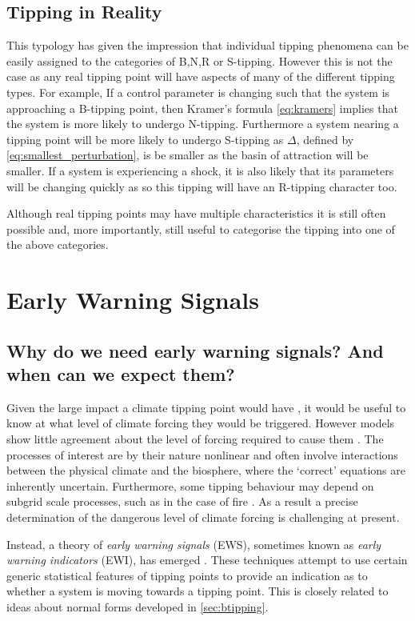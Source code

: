 \subsection{Tipping in Reality}
This typology has given the impression that individual tipping phenomena can be easily assigned to the categories of B,N,R or S-tipping. However this is not the case as any
real tipping point will have aspects of many of the different tipping types. For example, If a control parameter is changing such that the system is approaching a B-tipping point,
then Kramer's formula \cref{eq:kramers} implies that the system is more likely to undergo N-tipping. Furthermore a system nearing a tipping point will be more likely to undergo S-tipping as
$\Delta$, defined by \cref{eq:smallest_perturbation}, is be smaller as the basin of attraction will be smaller. If a system is experiencing a shock, it is also likely that its parameters will
be changing quickly as so this tipping will have an R-tipping character too.

Although real tipping points may have multiple characteristics it is still often possible and, more importantly, still useful to categorise the tipping into one of the above categories.


\section{Early Warning Signals}
\subsection{Why do we need early warning signals? And when can we expect them?}
Given the large impact a climate tipping point would have \parencite{Lenton2019a}, it would be useful to know at what level of climate forcing they would be triggered.
However models show little agreement about the level of forcing required to cause them \parencite{Drijfhout2015}. The processes of interest are by their nature
nonlinear and often involve interactions between the physical climate and the biosphere, where the `correct' equations are inherently uncertain. Furthermore,
some tipping behaviour may depend on subgrid scale processes, such as in the case of fire \parencite{Mangeon2016}. As a result a precise determination of the dangerous level of climate
forcing is challenging at present.

Instead, a theory of \emph{early warning signals} (EWS), sometimes known as  \emph{early warning indicators} (EWI), has emerged \parencite{Dakos2008,Scheffer2009,Lenton2011,Williamson2015}.
These techniques attempt to use certain generic statistical features of tipping points to provide an indication as to whether a system is
moving towards a tipping point. This is closely related to ideas about normal forms developed in \cref{sec:btipping}.

